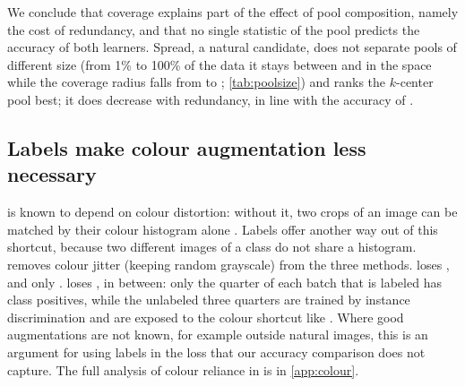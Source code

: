 We conclude that coverage explains part of the effect of pool composition, namely the cost of redundancy,
and that no single statistic of the pool predicts the accuracy of both learners. Spread, a natural
candidate, does not separate pools of different size (from 1\% to 100\% of the data it stays between
 and  in the \simclr space while the coverage radius
falls from  to ; \cref{tab:poolsize}) and ranks the
$k$-center pool best; it does decrease with redundancy, in line with the accuracy of \supcon.

\subsection{Labels make colour augmentation less necessary}
\label{sec:jitter}
\simclr is known to depend on colour distortion: without it, two crops of an image can be matched by their
colour histogram alone \citep{chen2020simclr,chen2021intriguing,robinson2021can}. Labels offer another way
out of this shortcut, because two different images of a class do not share a histogram. 
removes colour jitter (keeping random grayscale) from the three methods. \simclr loses
\pt, and \supcon only \pt. \union loses \pt, in between: only the quarter of each batch that is labeled has
class positives, while the unlabeled three quarters are trained by instance discrimination and are exposed to
the colour shortcut like \simclr. Where good augmentations are not
known, for example outside natural images, this is an argument for using labels in the loss that our
accuracy comparison does not capture. The full analysis of colour reliance in \simclr is in
\ref{app:colour}.

\begin{table}[t]
\centering
\small
\caption{Removing colour jitter from the augmentation (CIFAR-10, 10\% labels, 9,700 steps, \lpall accuracy
in \%, mean $\pm$ standard deviation over seeds; the change is computed per seed). Both columns use only the
seeds that have a run without colour jitter, so the first column can differ slightly from \cref{tab:main},
which averages five seeds.}
\label{tab:jitter}

\end{table}
